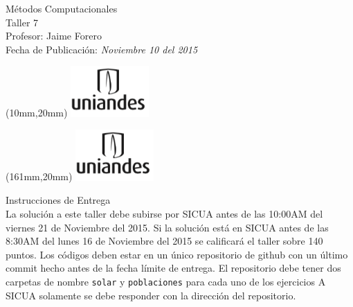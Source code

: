 \documentclass[11pt,letterpaper]{exam}
\begin{document}
\begin{center}
{\Large Métodos Computacionales} \\
Taller 7 \\
Profesor: Jaime Forero\\
Fecha de Publicación: {\small \it Noviembre 10 del 2015}\\
\end{center}

\begin{textblock*}{40mm}(10mm,20mm)
  \includegraphics[width=3cm]{logoUniandes.png}
\end{textblock*}

\begin{textblock*}{40mm}(161mm,20mm)
  \includegraphics[width=3cm]{logoUniandes.png}
\end{textblock*}

\vspace{0.5cm}

{\Large Instrucciones de Entrega}\\

\noindent
La solución a este taller debe subirse por SICUA antes de las 10:00AM
del viernes 21 de Noviembre del 2015. 
\noindent
Si la soluci\'on est\'a en SICUA
antes de las 8:30AM del lunes 16 de Noviembre del 2015 se calificar\'a
el taller sobre 140 puntos. 
\noindent
Los c\'odigos deben estar en un \'unico repositorio de github con un
\'ultimo commit hecho antes de la fecha l\'imite de entrega. El
repositorio debe tener dos carpetas de nombre \verb"solar" y
\verb"poblaciones" para cada uno de los ejercicios A SICUA
solamente se debe responder con la direcci\'on del repositorio.
\end{document}
